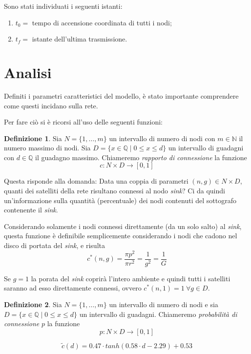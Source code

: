 \documentclass[a4paper,12pt]{article}
\theoremstyle{definition}
\newtheorem{definition}{Definizione}
\begin{document}
Sono stati individuati i seguenti istanti:

\begin{enumerate}
\item $t_0 =$ tempo di accensione coordinata di tutti i nodi;
\item $t_f =$ istante dell'ultima trasmissione.
\end{enumerate}

\section{Analisi}

Definiti i parametri caratteristici del modello, è stato importante comprendere come questi incidano sulla rete.

Per fare ciò si è ricorsi all'uso delle seguenti funzioni:

\begin{definition}
Sia $N = \{1, \dots, m\}$ un intervallo di numero di nodi con $m \in \mathbb{N}$ il numero massimo di nodi. Sia $D = \{x \in \mathbb{Q} \mid 0 \leq x \leq d\}$ un intervallo di guadagni con $d \in \mathbb{Q}$ il guadagno massimo. Chiameremo \emph{rapporto di connessione} la funzione
$$ c \colon N \times D \to [0, 1] $$
\end{definition}

Questa risponde alla domanda: Data una coppia di parametri $(n, g) \in N \times D$, quanti dei satelliti della rete risultano connessi al nodo \emph{sink}? Ci da quindi un'informazione sulla quantità (percentuale) dei nodi contenuti del sottografo contenente il \emph{sink}.

Considerando solamente i nodi connessi direttamente (da un solo salto) al \emph{sink}, questa funzione è definibile semplicemente considerando i nodi che cadono nel disco di portata del \emph{sink}, e risulta
\begin{equation}
c^{*}(n, g) = \frac{\pi p^2}{\pi r^2} = \frac{1}{g^2} = \frac{1}{G}
\end{equation}

Se $g = 1$ la porata del \emph{sink} coprirà l'intero ambiente e quindi tutti i satelliti saranno ad esso direttamente connessi, ovvero $c^{*}(n, 1) = 1 \ \forall g \in D$. 

\begin{definition}
Sia $N = \{1, \dots, m\}$ un intervallo di numero di nodi e sia $D = \{x \in \mathbb{Q} \mid 0 \leq x \leq d\}$ un intervallo di guadagni. Chiameremo \emph{probabilità di connessione} $p$ la funzione
$$ p \colon N \times D \to [0, 1] $$
\end{definition}

\begin{equation}
\tilde{c}(d) = 0.47 \cdot tanh(0.58 \cdot d - 2.29) + 0.53
\end{equation}
\end{document}
